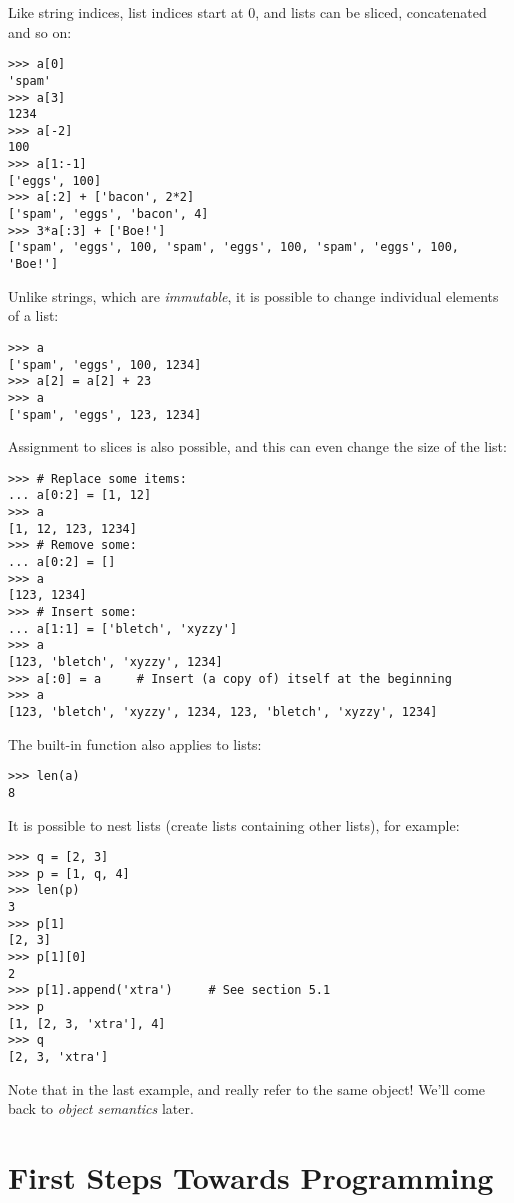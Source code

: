 \documentclass{manual}
\begin{document}
Like string indices, list indices start at 0, and lists can be sliced,
concatenated and so on:

\begin{verbatim}
>>> a[0]
'spam'
>>> a[3]
1234
>>> a[-2]
100
>>> a[1:-1]
['eggs', 100]
>>> a[:2] + ['bacon', 2*2]
['spam', 'eggs', 'bacon', 4]
>>> 3*a[:3] + ['Boe!']
['spam', 'eggs', 100, 'spam', 'eggs', 100, 'spam', 'eggs', 100, 'Boe!']
\end{verbatim}

Unlike strings, which are \emph{immutable}, it is possible to change
individual elements of a list:

\begin{verbatim}
>>> a
['spam', 'eggs', 100, 1234]
>>> a[2] = a[2] + 23
>>> a
['spam', 'eggs', 123, 1234]
\end{verbatim}

Assignment to slices is also possible, and this can even change the size
of the list:

\begin{verbatim}
>>> # Replace some items:
... a[0:2] = [1, 12]
>>> a
[1, 12, 123, 1234]
>>> # Remove some:
... a[0:2] = []
>>> a
[123, 1234]
>>> # Insert some:
... a[1:1] = ['bletch', 'xyzzy']
>>> a
[123, 'bletch', 'xyzzy', 1234]
>>> a[:0] = a     # Insert (a copy of) itself at the beginning
>>> a
[123, 'bletch', 'xyzzy', 1234, 123, 'bletch', 'xyzzy', 1234]
\end{verbatim}

The built-in function  also applies to lists:

\begin{verbatim}
>>> len(a)
8
\end{verbatim}

It is possible to nest lists (create lists containing other lists),
for example:

\begin{verbatim}
>>> q = [2, 3]
>>> p = [1, q, 4]
>>> len(p)
3
>>> p[1]
[2, 3]
>>> p[1][0]
2
>>> p[1].append('xtra')     # See section 5.1
>>> p
[1, [2, 3, 'xtra'], 4]
>>> q
[2, 3, 'xtra']
\end{verbatim}

Note that in the last example,  and  really refer to
the same object!  We'll come back to \emph{object semantics} later.

\section{First Steps Towards Programming}
\label{firstSteps}
\end{document}
